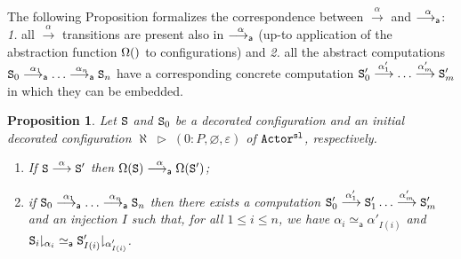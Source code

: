 \documentclass{LMCS}
\theoremstyle{plain}\newtheorem{proposition}[thm]{Proposition}
\theoremstyle{plain}\newtheorem{lemma}[thm]{Lemma}
\theoremstyle{plain}\newtheorem{theorem}[thm]{Theorem}
\theoremstyle{plain}\newtheorem{corollary}[thm]{Corollary}
\newif\ifconf \conffalse
\newcommand{\State}{{\tt S}}
\newcommand{\lred}[1]{\stackrel{#1}{\longrightarrow}}
\newcommand{\proj}[2]{{#1\!\!\downharpoonright_{#2}}}
\newcommand{\actsl}{${\tt Actor^{\tt sl}}$}
\begin{document}
\ifconf
\else

\noindent The following Proposition formalizes the correspondence 
between $\lred{\alpha}$ and $\stackrel{\alpha}{\longrightarrow_{\mathsf a}}$: 
\emph{1.} all $\lred{\alpha}$ transitions are present also in $\stackrel{\alpha}{\longrightarrow_{\mathsf a}}$
(up-to application of the abstraction 
function $\Omega()$ to configurations) and
\emph{2.} all the abstract computations $\State_0 \absred{\alpha_1} \ldots 
\absred{\alpha_n} \State_n$ have a corresponding concrete computation
$\State'_0 \lred{\alpha'_1} \ldots \lred{\alpha'_m} \State'_m$
in which they can be embedded.
\begin{proposition}
\label{prop:abssemantics}
Let $\State$ and $\State_0$ be a decorated configuration
and an initial 
decorated configuration $\aleph \; \triangleright \; (0:P, \varnothing, \varepsilon)$
of {\actsl}, respectively.
\begin{enumerate}
\item
If $\State \lred{\alpha} \State'$ then 
$\abst{\State} \absred{\alpha} \abst{\State'}$;
\item
if $\State_0 \absred{\alpha_1} \ldots 
\absred{\alpha_n} \State_n$ then there exists a computation
$\State'_0 \lred{\alpha'_1} \State'_1 \ldots \lred{\alpha'_m} \State'_m$ and an injection $I$ 
such that, for all $1\leq i \leq n$, 
we have $\alpha_i \simeq_{\mathsf a} \alpha'_{I(i)}$ and 
$\proj{\State_i}{\alpha_i} \simeq_{\mathsf a} \proj{\State'_{I(i)}}{\alpha'_{I(i)}}$.
\end{enumerate}
\end{proposition}
\end{document}
